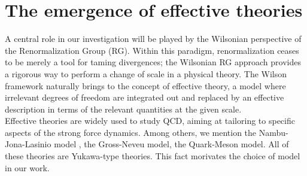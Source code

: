 \section{The emergence of effective theories}
A central role in our investigation will be played by the Wilsonian perspective of the Renormalization Group (RG). Within this paradigm, renormalization ceases to be merely a tool for taming divergences; 
the Wilsonian RG approach provides a rigorous way to perform a change of scale in a physical theory. The Wilson framework naturally brings to the concept of effective theory, a model where irrelevant degrees of freedom are integrated out and replaced by an effective description in terms of the relevant quantities at the given scale.  \\
Effective theories are widely used to study QCD, aiming at tailoring to specific aspects of the strong force dynamics. 
Among others, we mention the Nambu-Jona-Lasinio model \cite{Nambu1961DynamicalI, Nambu1961DynamicalII}, the Gross-Neveu model, the Quark-Meson model. All of these theories are Yukawa-type theories. This fact morivates the choice of model in our work.

